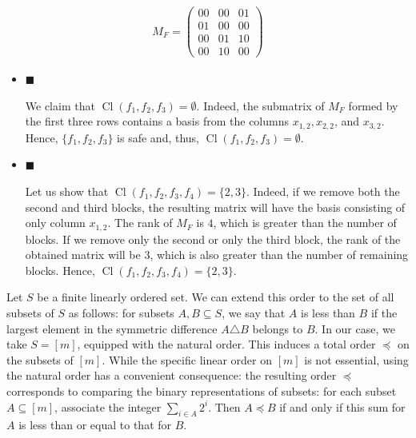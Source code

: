  
\[\begin{gathered}M_{F}=\begin{pmatrix}00&00&01\\
01&00&00\\
00&01&10\\
00&10&00\end{pmatrix}\end{gathered}\] 
 






\begin{itemize}


\item 
$\blacksquare$ 


We claim that $\mathop{\mathrm{Cl}}(f_{1},f_{2},f_{3})=\emptyset$. Indeed, the submatrix of $M_{F}$ formed by the first three rows contains a basis from the columns $x_{1,2},x_{2,2}$, and $x_{3,2}$. Hence, $\{f_{1},f_{2},f_{3}\}$ is safe and, thus, $\mathop{\mathrm{Cl}}(f_{1},f_{2},f_{3})=\emptyset$.\par





\item 
$\blacksquare$ 


Let us show that $\mathop{\mathrm{Cl}}(f_{1},f_{2},f_{3},f_{4})=\{2,3\}$.
Indeed, if we remove both the second and third blocks, the resulting matrix will have the basis consisting of only column $x_{1,2}$. The rank of $M_{F}$ is $4$, which is greater than the number of blocks. If we remove only the second or only the third block, the rank of the obtained matrix will be $3$, which is also greater than the number of remaining blocks. Hence, $\mathop{\mathrm{Cl}}(f_{1},f_{2},f_{3},f_{4})=\{2,3\}$.\par





\end{itemize}




Let $S$ be a finite linearly ordered set. We can extend this order to the set of all subsets of $S$ as follows: for subsets $A,B\subseteq S$, we say that $A$ is less than $B$ if the largest element in the symmetric difference $A\triangle B$ belongs to $B$. In our case, we take $S=[m]$, equipped with the natural order. This induces a total order $\preceq$ on the subsets of $[m]$. While the specific linear order on $[m]$ is not essential, using the natural order has a convenient consequence: the resulting order $\preceq$ corresponds to comparing the binary representations of subsets: for each subset $A\subseteq[m]$, associate the integer $\sum_{i\in A}2^{i}$. Then $A\preceq B$ if and only if this sum for $A$ is less than or equal to that for $B$.\par



